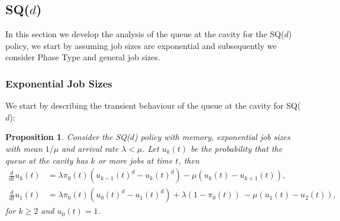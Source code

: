 \documentclass[12pt]{report}
\newtheorem{proposition}[theorem]{Proposition}
\begin{document}
\subsection{SQ($d$)}
In this section we develop the analysis of the queue at the cavity for the SQ($d$) policy, we start by assuming job sizes are exponential and subsequently we consider Phase Type and general job sizes.
\subsubsection{Exponential Job Sizes}
We start by describing the transient behaviour of the queue at the cavity for SQ($d$):
\begin{proposition}\label{prop:trans} 
Consider the SQ($d$) policy with memory, exponential job sizes with mean $1/\mu$ and
arrival rate $\lambda < \mu$.
Let $u_k(t)$ be the probability that the queue at the cavity has $k$ or more jobs at time $t$, then
\begin{align}
\frac{d}{dt} u_k(t)
&=
\lambda \pi_0(t) (u_{k-1}(t)^d - u_k(t)^d)
-
\mu (u_k(t)-u_{k+1}(t)),
  \label{eq:transient_memory_SQd1}\\
\frac{d}{dt} u_1(t)
&=
\lambda \pi_0(t) (u_{0}(t)^d - u_1(t)^d) +
\lambda (1-\pi_0(t))\
- \mu (u_1(t) - u_{2}(t)), \label{eq:transient_memory_SQd2}
\end{align}
for $k \geq 2$ and $u_0(t)=1$.
\end{proposition}
\end{document}

